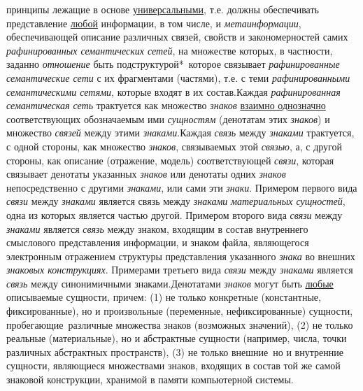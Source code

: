 \begin{SCn}
\begin{scnsubstruct}
\begin{scnrelfromvector}{принципы лежащие в основе}
{				\uline{универсальными}, т.е. должны обеспечивать представление \uline{любой}
				информации, в том числе, и \textit{метаинформации}, обеспечивающей описание
				различных связей, свойств и закономерностей самих \textit{рафинированных
					семантических сетей}, на множестве которых, в частности, заданно
				\textit{отношение} быть подструктурой*\, которое связывает
				\textit{рафинированные семантические сети} с их фрагментами (частями), т.е. с
				теми \textit{рафинированными семантическими сетями}, которые входят в их
				состав.\newline Каждая \textit{рафинированная семантическая сеть} трактуется
				как множество \textit{знаков} \uline{взаимно однозначно} соответствующих
				обозначаемым ими \textit{сущностям} (денотатам этих \textit{знаков}) и
				множество \textit{связей} между этими \textit{знаками}.\newline Каждая
				\textit{связь} между \textit{знаками} трактуется, с одной стороны, как
				множество \textit{знаков}, связываемых этой \textit{связью}, а, с другой
				стороны, как описание (отражение, модель) соответствующей \textit{связи},
				которая связывает денотаты указанных \textit{знаков} или денотаты одних
				\textit{знаков} непосредственно с другими \textit{знаками}, или сами эти
				\textit{знаки}. Примером первого вида \textit{связи} между \textit{знаками}
				является связь между \textit{знаками} \textit{материальных сущностей}, одна из
				которых является частью другой. Примером второго вида \textit{связи} между
				\textit{знаками} является \textit{связь} между знаком, входящим в состав
				внутреннего смыслового представления информации, и знаком файла, являющегося
				электронным отражением структуры представления указанного \textit{знака} во
				внешних \textit{знаковых конструкциях}. Примерами третьего вида \textit{связи}
				между \textit{знаками} является \textit{связь} между синонимичными
				знаками.\newline Денотатами \textit{знаков} могут быть \uline{любые}
				описываемые сущности, причем: (1) не только конкретные (константные,
				фиксированные), но и произвольные (переменные, нефиксированные)  сущности,
				пробегающие\ различные множества знаков (возможных значений), (2) не только
				реальные (материальные), но и абстрактные сущности (например, числа, точки
				различных абстрактных пространств), (3) не только внешние\, но и внутренние
				сущности, являющиеся множествами знаков, входящих в состав той же самой
				знаковой конструкции, хранимой в памяти компьютерной системы.}
\end{scnrelfromvector}
\end{scnsubstruct}
\end{SCn}
